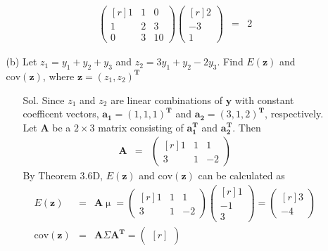 \documentclass[12pt]{article} %
\begin{document}
\begin{enumerate}
\begin{enumerate}
\begin{enumerate}
\begin{eqnarray*}
					\begin{pmatrix}[r]
						1 & 1 & 0 \\
						1 & 2 & 3 \\
						0 & 3 & 10 
					\end{pmatrix}
					\begin{pmatrix}[r]
						 2 \\
							   -3 \\
						 1	
					\end{pmatrix}
					&=&2												
				\end{eqnarray*}
			\end{enumerate}
		\item[(b)] Let $z_{1}=y_{1}+y_{2}+y_{3}$ and $z_{2}=3y_{1}+y_{2}-2y_{3}$. 
		Find $E(\mathbf{z})$ and $\mathrm{cov(\mathbf{z})}$, where
		 $\mathbf{z}=(z_{1}, z_{2})^\mathbf{T}$
		 \begin{enumerate}
		 	\item[Sol.] Since $z_{1}$ and $z_{2}$ are linear combinations of 
		 	$\mathbf{y}$ with constant coefficent vectors, 
		 	$\mathbf{a_{1}}=(1,1,1)^\mathbf{T}$ and $\mathbf{a_{2}}=(3,1,2)^\mathbf{T}$, respectively.
		 	Let $\mathbf{A}$ be a $2 \times 3$ matrix consisting of $\mathbf{a_{1}^{T}}$
		 	and $\mathbf{a_{2}^{T}}$. Then 
		 	\begin{eqnarray*}
		 		\mathbf{A}&=&
				\begin{pmatrix}[r]
					1 & 1 &  1 \\
					3 & 1 & 		  -2 
				\end{pmatrix}		 		
		 	\end{eqnarray*}
		 	By Theorem 3.6D, $E(\mathbf{z})$ and $\mathrm{cov(\mathbf{z})}$
		 	can be calculated as
		 	\begin{eqnarray*}
		 	E(\mathbf{z})&=&\mathbf{A}\upmu=
		 	\begin{pmatrix}[r]
				1 & 1 &  1 \\
				3 & 1 & 		  -2 		 	
		 	\end{pmatrix}
		 	\begin{pmatrix}[r]
				 1 \\
					   -1 \\
				 3			 		
		 	\end{pmatrix}
		 	=
		 	\begin{pmatrix}[r]
				 3 \\
					   -4 		 		
		 	\end{pmatrix}\\
		 	\mathrm{cov}(\mathbf{z})&=&\mathbf{A}\Sigma\mathbf{A^{T}}=
		 	\begin{pmatrix}[r]

\end{pmatrix}
\end{eqnarray*}
\end{enumerate}
\end{enumerate}
\end{enumerate}
\end{document}
